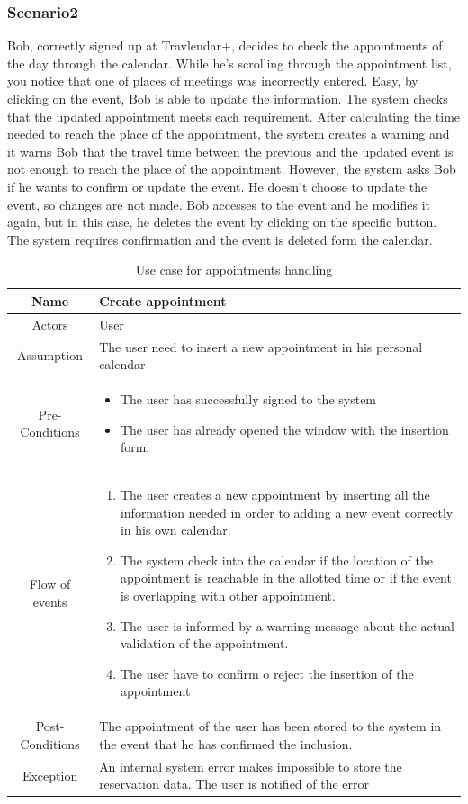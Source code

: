 \subsubsection{Scenario2}
Bob, correctly signed up at Travlendar+, decides to check the appointments of the day through the calendar. While he’s scrolling through the appointment list, you notice that one of places of meetings was incorrectly entered. Easy, by clicking on the event, Bob is able to update the information. The system checks that the updated appointment meets each requirement. After calculating the time needed to reach the place of the appointment, the system creates a warning and it warns Bob that the travel time between the previous and the updated event is not enough to reach the place of the appointment. However, the system asks Bob if he wants to confirm or update the event.
He doesn’t choose to update the event, so changes are not made.
Bob accesses to the event and he modifies it again, but in this case, he deletes the event by clicking on the specific button. The system requires confirmation and the event is deleted form the calendar.

\begin{table}
\centering
	\begin{tabular}{|c||p{}|}
		\hline
		Name & Create appointment \\ \hline
		Actors & User \\ \hline
		Assumption & The user need to insert a new appointment in his personal calendar \\ \hline
		Pre-Conditions & \begin{itemize}
			\item The user has successfully signed to the system
			\item The user has already opened the window with the insertion form.
		\end{itemize} \\ \hline
		Flow of events & \begin{enumerate}
			\item The user creates a new appointment by inserting all the information needed in order to adding a new event correctly in his own calendar.
			\item The system check into the calendar if the location of the appointment is reachable in the allotted time or if the event is overlapping with other appointment.
			\item The user is informed by a warning message about the actual validation of the appointment.
			\item The user have to confirm o reject the insertion of the appointment
		\end{enumerate} \\ \hline
		Post-Conditions & The appointment of the user has been stored to the system in the event that he has confirmed the inclusion. \\ \hline
		Exception & An internal system error makes impossible to store the reservation data. The user is notified of the error \\ \hline		
	\end{tabular}
\caption{Use case for appointments handling}
\label{usecase_app}
\end{table}

